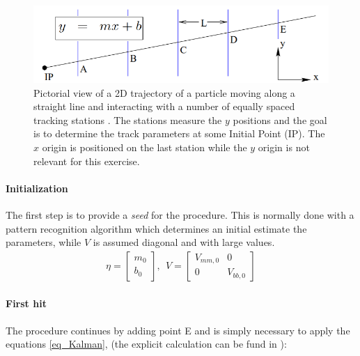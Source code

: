 \documentclass[12pt,a4paper,openright, oneside, titlepage]{book} %
\begin{document}
\begin{figure}[h!]
\centering
\includegraphics[scale=0.7]{Kutschke_Kalman}
\caption[2D kalman linear filter]{Pictorial view of a 2D trajectory of a particle moving along a straight line 
and interacting with a number of equally spaced tracking stations \cite{Kutschke}. 
The stations measure the $y$ positions and the goal is to determine the track parameters 
at some Initial Point (IP). 
The $x$ origin is positioned on the last station while the $y$ origin is not relevant for this exercise.}
\label{_Kutschke_Kalman}
\end{figure}

\paragraph{Initialization} 
The first step is to provide a \textit{seed} for the procedure. 
This is normally done with a pattern recognition algorithm 
which determines an initial estimate the parameters, 
while $V$ is assumed diagonal and with large values.
\begin{align*}
\eta = \begin{bmatrix} m_0 \\  b_0 \end{bmatrix},\ \ V=\begin{bmatrix} V_{mm,0}& 0 \\ 0& V_{bb,0} \end{bmatrix}
\end{align*}

\paragraph{First hit} 
The procedure continues by adding point E
and is simply necessary to apply the equations \ref{eq_Kalman}, 
(the explicit calculation can be fund in \cite{Kutschke}):
\end{document}
